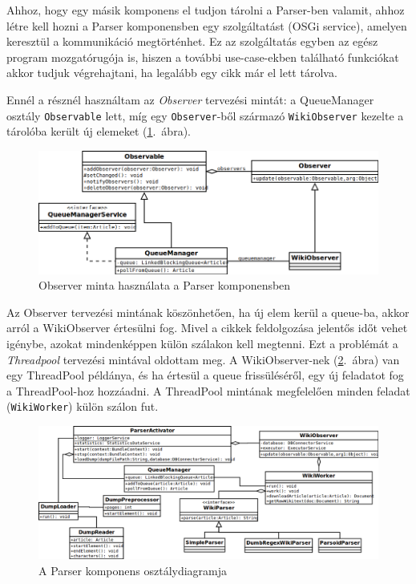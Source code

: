 Ahhoz, hogy egy másik komponens el tudjon tárolni a Parser-ben valamit, ahhoz létre kell hozni a Parser komponensben egy szolgáltatást (OSGi service), amelyen keresztül a kommunikáció megtörténhet. Ez az szolgáltatás egyben az egész program mozgatórugója is, hiszen a további use-case-ekben található funkciókat akkor tudjuk végrehajtani, ha legalább egy cikk már el lett tárolva.

Ennél a résznél használtam az \textit{Observer} tervezési mintát\cite{designpatterns}: a QueueManager osztály \texttt{Observable} lett, míg egy \texttt{Observer}-ből származó \texttt{WikiObserver} kezelte a tárolóba került új elemeket (\ref{fig:class_parser}.~ábra).

\begin{figure}[htp]
\centering
\includegraphics[scale=0.5]{img/class_parser}
\caption{Observer minta használata a Parser komponensben}
\label{fig:class_parser}
\end{figure}

Az Observer tervezési mintának köszönhetően, ha új elem kerül a queue-ba, akkor arról a WikiObserver értesülni fog. Mivel a cikkek feldolgozása jelentős időt vehet igénybe, azokat mindenképpen külön szálakon kell megtenni. Ezt a problémát a \textit{Threadpool} tervezési mintával oldottam meg\cite{javaconcurrencyinpractice}. A WikiObserver-nek (\ref{fig:class_parser2}.~ábra) van egy ThreadPool példánya, és ha értesül a queue frissüléséről, egy új feladatot fog a ThreadPool-hoz hozzáadni. A ThreadPool mintának megfelelően minden feladat (\texttt{WikiWorker}) külön szálon fut. 

\begin{figure}[htp]
\centering
\includegraphics[scale=0.4]{img/class_parser2}
\caption{A Parser komponens osztálydiagramja}
\label{fig:class_parser2}
\end{figure}

